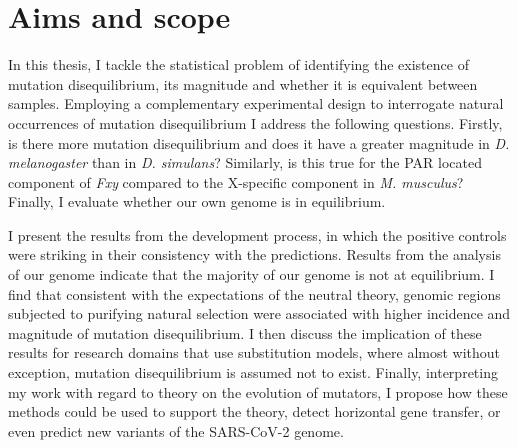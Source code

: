 \section{Aims and scope}

In this thesis, I tackle the statistical problem of identifying the existence of mutation disequilibrium, its magnitude and whether it is equivalent between samples. Employing a complementary experimental design to interrogate natural occurrences of mutation disequilibrium I address the following questions. Firstly, is there more mutation disequilibrium and does it have a greater magnitude in \textit{D. melanogaster} than in \textit{D. simulans}? Similarly, is this true for the PAR located component of \textit{Fxy} compared to the X-specific component in \textit{M. musculus}? Finally, I evaluate whether our own genome is in equilibrium. 

I present the results from the development process, in which the positive controls were striking in their consistency with the predictions. Results from the analysis of our genome indicate that the majority of our genome is not at equilibrium. I find that consistent with the expectations of the neutral theory, genomic regions subjected to purifying natural selection were associated with higher incidence and magnitude of mutation disequilibrium. I then discuss the implication of these results for research domains that use substitution models, where almost without exception, mutation disequilibrium is assumed not to exist. Finally, interpreting my work with regard to theory on the evolution of mutators, I propose how these methods could be used to support the theory, detect horizontal gene transfer, or even predict new variants of the SARS-CoV-2 genome. 